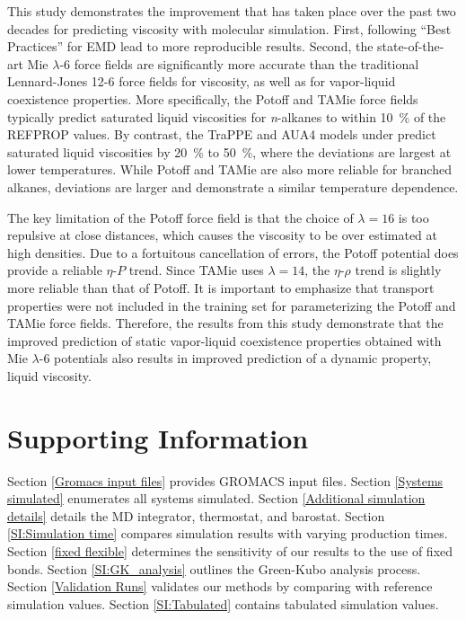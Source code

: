 \documentclass[preprint,review,12pt]{elsarticle}
\begin{document}
	This study demonstrates the improvement that has taken place over the past two decades for predicting viscosity with molecular simulation. First, following ``Best Practices'' for EMD lead to more reproducible results. Second, the state-of-the-art Mie $\lambda$-6 force fields are significantly more accurate than the traditional Lennard-Jones 12-6 force fields for viscosity, as well as for vapor-liquid coexistence properties. More specifically, the Potoff and TAMie force fields typically predict saturated liquid viscosities for \textit{n}-alkanes to within 10~\% of the REFPROP values. By contrast, the TraPPE and AUA4 models under predict saturated liquid viscosities by 20~\% to 50~\%, where the deviations are largest at lower temperatures. While Potoff and TAMie are also more reliable for branched alkanes, deviations are larger and demonstrate a similar temperature dependence. 
	
	The key limitation of the Potoff force field is that the choice of $\lambda = 16$ is too repulsive at close distances, which causes the viscosity to be over estimated at high densities. Due to a fortuitous cancellation of errors, the Potoff potential does provide a reliable $\eta$-$P$ trend. Since TAMie uses $\lambda =14$, the $\eta$-$\rho$ trend is slightly more reliable than that of Potoff. It is important to emphasize that transport properties were not included in the training set for parameterizing the Potoff and TAMie force fields. Therefore, the results from this study demonstrate that the improved prediction of static vapor-liquid coexistence properties obtained with Mie $\lambda$-6 potentials also results in improved prediction of a dynamic property, liquid viscosity.
	
	
	\section*{Supporting Information}
	
    Section \ref{Gromacs input files} provides GROMACS input files.	Section \ref{Systems simulated} enumerates all systems simulated. Section \ref{Additional simulation details} details the MD integrator, thermostat, and barostat. Section \ref{SI:Simulation time} compares simulation results with varying production times. Section \ref{fixed flexible} determines the sensitivity of our results to the use of fixed bonds. Section \ref{SI:GK_analysis} outlines the Green-Kubo analysis process. Section \ref{Validation Runs} validates our methods by comparing with reference simulation values. Section \ref{SI:Tabulated} contains tabulated simulation values.       
	
\end{document}
